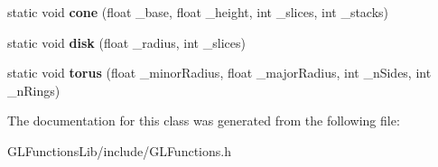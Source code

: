 \begin{DoxyCompactItemize}
\item 
static void {\bfseries cone} (float \+\_\+base, float \+\_\+height, int \+\_\+slices, int \+\_\+stacks)\hypertarget{classGLFunctions_a471fd78e978c74b54fd54f4b240341a2}{}\label{classGLFunctions_a471fd78e978c74b54fd54f4b240341a2}

\item 
static void {\bfseries disk} (float \+\_\+radius, int \+\_\+slices)\hypertarget{classGLFunctions_aca7c72689f74beb6e6bd5a296f96155f}{}\label{classGLFunctions_aca7c72689f74beb6e6bd5a296f96155f}

\item 
static void {\bfseries torus} (float \+\_\+minor\+Radius, float \+\_\+major\+Radius, int \+\_\+n\+Sides, int \+\_\+n\+Rings)\hypertarget{classGLFunctions_ae15d01f8935596011c0bdf3a9f604607}{}\label{classGLFunctions_ae15d01f8935596011c0bdf3a9f604607}

\end{DoxyCompactItemize}


The documentation for this class was generated from the following file\+:\begin{DoxyCompactItemize}
\item 
G\+L\+Functions\+Lib/include/G\+L\+Functions.\+h\end{DoxyCompactItemize}
